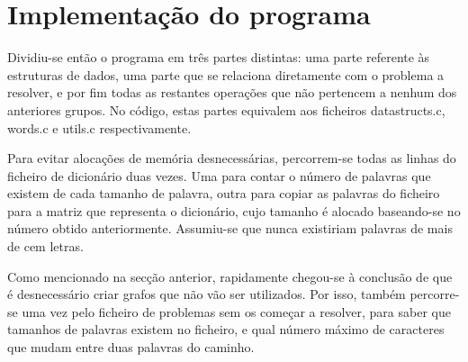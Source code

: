 \documentclass[a4paper, 11pt]{article}
\begin{document}
\section{Implementação do programa}
    \par Dividiu-se então o programa em três partes distintas: uma parte referente às estruturas de dados, uma parte que se relaciona diretamente com o problema a resolver, e por fim todas as restantes operações que não pertencem a nenhum dos anteriores grupos. No código, estas partes equivalem aos ficheiros datastructs.c, words.c e utils.c respectivamente.
    \par Para evitar alocações de memória desnecessárias, percorrem-se todas as linhas do ficheiro de dicionário duas vezes. Uma para contar o número de palavras que existem de cada tamanho de palavra, outra para copiar as palavras do ficheiro para a matriz que representa o dicionário, cujo tamanho é alocado baseando-se no número obtido anteriormente. Assumiu-se que nunca existiriam palavras de mais de cem letras.
    \par Como mencionado na secção anterior, rapidamente chegou-se à conclusão de que é desnecessário criar grafos que não vão ser utilizados. Por isso, também percorre-se uma vez pelo ficheiro de problemas sem os começar a resolver, para saber que tamanhos de palavras existem no ficheiro, e qual número máximo de caracteres que mudam entre duas palavras do caminho.
    
\end{document}
